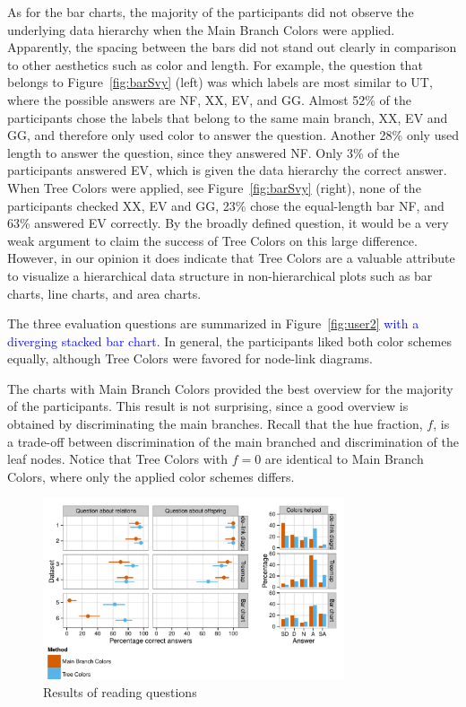 \documentclass[journal]{vgtc}                %
\newcommand{\changedM}[1]{\textcolor{blue}{#1}}
\begin{document}
As for the bar charts, the majority of the participants did not observe the underlying data hierarchy when the Main Branch Colors were applied. Apparently, the spacing between the bars did not stand out clearly in comparison to other aesthetics such as color and length. For example, the question that belongs to Figure~\ref{fig:barSvy} (left) was which labels are most similar to UT, where the possible answers are NF, XX, EV, and GG. Almost 52\% of the participants chose the labels that belong to the same main branch, XX, EV and GG, and therefore only used color to answer the question. Another 28\% only used length to answer the question, since they answered NF. Only 3\% of the participants answered EV, which is given the data hierarchy the correct answer. When Tree Colors were applied, see Figure~\ref{fig:barSvy} (right), none of the participants checked XX, EV and GG, 23\% chose the equal-length bar NF, and 63\% answered EV correctly. By the broadly defined question, it would be a very weak argument to claim the success of Tree Colors on this large difference. However, in our opinion it does indicate that Tree Colors are a valuable attribute to visualize a hierarchical data structure in non-hierarchical plots such as bar charts, line charts, and area charts.

The three evaluation questions are summarized in Figure~\ref{fig:user2} \changedM{with a diverging stacked bar chart.} In general, the participants liked both color schemes equally, although Tree Colors were favored for node-link diagrams.

The charts with Main Branch Colors provided the best overview for the majority of the participants. This result is not surprising, since a good overview is obtained by discriminating the main branches. 
Recall that the hue fraction, $f$, is a trade-off between discrimination of the main branched and discrimination of the leaf nodes. Notice that Tree Colors with $f=0$ are identical to Main Branch Colors, where only the applied color schemes differs.

\begin{figure}[tb]
  \centering
	\includegraphics[width=3.5in]{user_study_results_mod2.pdf}
  \caption{Results of reading questions}\label{fig:user1}
\end{figure}
\end{document}
